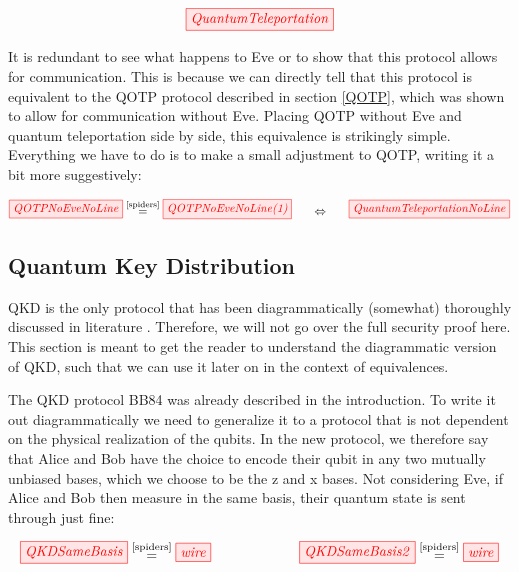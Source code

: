 \documentclass[]{article}
\newcommand{\equaltext}[1]{\ensuremath{\stackrel{\text{#1}}{=}}}
\begin{document}
\begin{equation}
	\label{equation:quantumteleportation}
	\tikzfig{QuantumTeleportation}
\end{equation}
 
It is redundant to see what happens to Eve or to show that this protocol allows for communication. This is because we can directly tell that this protocol is equivalent to the QOTP protocol described in section \ref{QOTP}, which was shown to allow for communication without Eve. Placing QOTP without Eve and quantum teleportation side by side, this equivalence is strikingly simple. Everything we have to do is to make a small adjustment to QOTP, writing it a bit more suggestively:

\begin{equation}
\label{equation:QOTPQuantumTeleportationEquivalence}
\tikzfig{QOTPNoEveNoLine} \equaltext{\ref{spiders}} \tikzfig{QOTPNoEveNoLine(1)}~~~~~ \Leftrightarrow ~~~~~\tikzfig{QuantumTeleportationNoLine}
\end{equation}
 
\subsection{Quantum Key Distribution}

\label{QuantumKeyDistribution}

QKD is the only protocol that has been diagrammatically (somewhat) thoroughly discussed in literature \cite{Kissinger2017}. Therefore, we will not go over the full security proof here. This section is meant to get the reader to understand the diagrammatic version of QKD, such that we can use it later on in the context of equivalences.

The QKD protocol BB84 was already described in the introduction. To write it out diagrammatically we need to generalize it to a protocol that is not dependent on the physical realization of the qubits. In the new protocol, we therefore say that Alice and Bob have the choice to encode their qubit in any two mutually unbiased bases, which we choose to be the z and x bases. Not considering Eve, if Alice and Bob then measure in the same basis, their quantum state is sent through just fine:

\begin{equation}
	\tikzfig{QKDSameBasis} \equaltext{\ref{spiders}} \tikzfig{wire} ~~~~~~~~~~~~~~~~~~~ \tikzfig{QKDSameBasis2} \equaltext{\ref{spiders}} \tikzfig{wire}
\end{equation}
\end{document}
